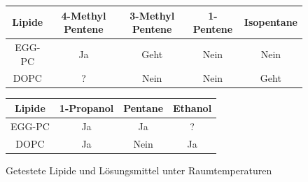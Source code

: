 \begin{figure}[h]
	\begin{tabular}{|c|c|c|c|c|}
		\hline
		Lipide & 4-Methyl Pentene & 3-Methyl Pentene & 1-Pentene & Isopentane \\
		\hline
		EGG-PC & Ja & Geht & Nein & Nein \\
		\hline
		DOPC & ? & Nein & Nein & Geht \\
		\hline
	\end{tabular}
	\begin{tabular}{|c|c|c|c|}
		\hline
		Lipide &  1-Propanol & Pentane & Ethanol \\
		\hline
		EGG-PC & Ja & Ja & ? \\
		\hline
		DOPC & Ja & Nein & Ja \\
		\hline
	\end{tabular}
	\caption{Getestete Lipide und Lösungsmittel unter Raumtemperaturen}
\end{figure}

